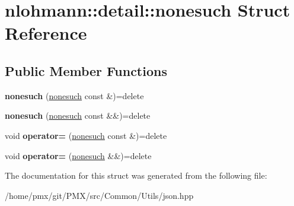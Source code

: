 \hypertarget{structnlohmann_1_1detail_1_1nonesuch}{}\section{nlohmann\+:\+:detail\+:\+:nonesuch Struct Reference}
\label{structnlohmann_1_1detail_1_1nonesuch}
\subsection*{Public Member Functions}
\begin{DoxyCompactItemize}
\item 
\mbox{\label{structnlohmann_1_1detail_1_1nonesuch_a563462ef2d05fe60cdf1dc7f567dc276}} 
{\bfseries nonesuch} (\hyperlink{structnlohmann_1_1detail_1_1nonesuch}{nonesuch} const \&)=delete
\item 
\mbox{\label{structnlohmann_1_1detail_1_1nonesuch_ad7719f7d2a00263be8b8d123870217d8}} 
{\bfseries nonesuch} (\hyperlink{structnlohmann_1_1detail_1_1nonesuch}{nonesuch} const \&\&)=delete
\item 
\mbox{\label{structnlohmann_1_1detail_1_1nonesuch_add6ef84c52a851e391cef514c85f2ffe}} 
void {\bfseries operator=} (\hyperlink{structnlohmann_1_1detail_1_1nonesuch}{nonesuch} const \&)=delete
\item 
\mbox{\label{structnlohmann_1_1detail_1_1nonesuch_a78ca022a1b4defe4f7ba662843602231}} 
void {\bfseries operator=} (\hyperlink{structnlohmann_1_1detail_1_1nonesuch}{nonesuch} \&\&)=delete
\end{DoxyCompactItemize}


The documentation for this struct was generated from the following file\+:\begin{DoxyCompactItemize}
\item 
/home/pmx/git/\+P\+M\+X/src/\+Common/\+Utils/json.\+hpp\end{DoxyCompactItemize}
